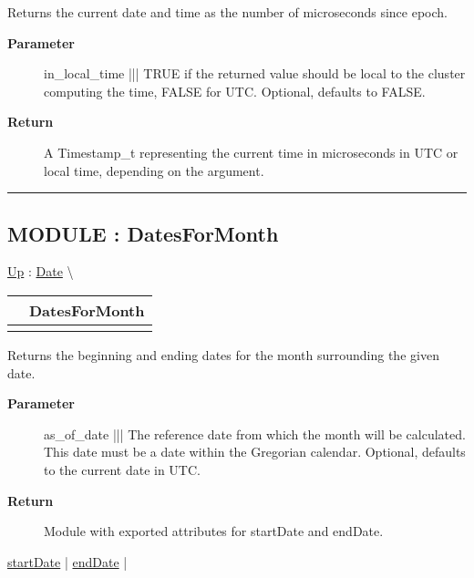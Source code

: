 \par
Returns the current date and time as the number of microseconds since epoch.

\par
\begin{description}
\item [\textbf{Parameter}] in\_local\_time ||| TRUE if the returned value should be local to the cluster computing the time, FALSE for UTC. Optional, defaults to FALSE.
\item [\textbf{Return}] A Timestamp\_t representing the current time in microseconds in UTC or local time, depending on the argument.
\end{description}

\rule{\linewidth}{0.5pt}
\subsection*{MODULE : DatesForMonth}
\hypertarget{ecldoc:date.datesformonth}{}
\hyperlink{ecldoc:Date}{Up} :
\hspace{0pt} \hyperlink{ecldoc:Date}{Date} \textbackslash 

{\renewcommand{\arraystretch}{1.5}
\begin{tabularx}{\textwidth}{|>{\raggedright\arraybackslash}l|X|}
\hline
\hspace{0pt} & DatesForMonth \\
\hline
\multicolumn{2}{|>{\raggedright\arraybackslash}X|}{\hspace{0pt}(Date\_t as\_of\_date = CurrentDate(FALSE))} \\
\hline
\end{tabularx}
}

\par
Returns the beginning and ending dates for the month surrounding the given date.

\par
\begin{description}
\item [\textbf{Parameter}] as\_of\_date ||| The reference date from which the month will be calculated. This date must be a date within the Gregorian calendar. Optional, defaults to the current date in UTC.
\item [\textbf{Return}] Module with exported attributes for startDate and endDate.
\end{description}

\hyperlink{ecldoc:date.datesformonth.result.startdate}{startDate}  |
\hyperlink{ecldoc:date.datesformonth.result.enddate}{endDate}  |

